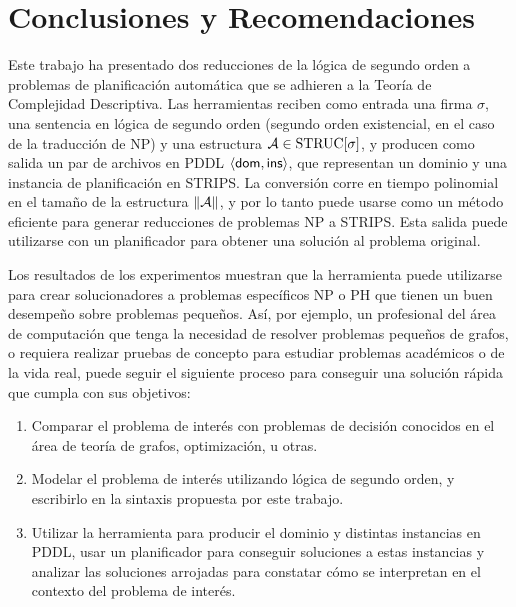 \chapter{Conclusiones y Recomendaciones}
\label{Capitulo5}

Este trabajo ha presentado dos reducciones de la lógica de segundo orden a
problemas de planificación automática que se adhieren a la Teoría de
Complejidad Descriptiva. Las herramientas reciben como entrada una firma
$\sigma$, una sentencia en lógica de segundo orden (segundo orden existencial,
en el caso de la traducción de NP) y una estructura $\mathcal{A}\in\text{STRUC}[\sigma]$, y
producen como salida un par de archivos en PDDL $\langle \mathsf{dom},\mathsf{ins} \rangle$, que
representan un dominio y una instancia de planificación en STRIPS. La
conversión corre en tiempo polinomial en el tamaño de la estructura $\|\mathcal{A}\|$, y
por lo tanto puede usarse como un método eficiente para generar reducciones de
problemas NP a STRIPS. Esta salida puede utilizarse con un planificador 
para obtener una solución al problema original.

Los resultados de los experimentos muestran que la herramienta puede utilizarse
para crear solucionadores a problemas específicos NP o PH que tienen un buen desempeño
sobre problemas pequeños. Así, por ejemplo, un profesional del área de
computación que tenga la necesidad de resolver problemas pequeños de grafos, o
requiera realizar pruebas de concepto para estudiar problemas académicos o de la vida
real, puede seguir el siguiente proceso para conseguir una solución rápida que
cumpla con sus objetivos:
\begin{enumerate}
\item Comparar el problema de interés con problemas de decisión conocidos en el
área de teoría de grafos, optimización, u otras.
\item Modelar el problema de interés utilizando lógica de segundo orden, y
escribirlo en la sintaxis propuesta por este trabajo.
\item Utilizar la herramienta para producir el dominio y distintas instancias
en PDDL, usar un planificador para conseguir soluciones a estas instancias y
analizar las soluciones arrojadas para constatar cómo se interpretan en el contexto del
problema de interés.
\end{enumerate}


